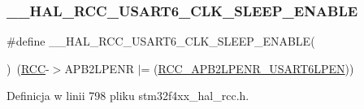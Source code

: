 \subsubsection{\texorpdfstring{\+\_\+\+\_\+\+H\+A\+L\+\_\+\+R\+C\+C\+\_\+\+U\+S\+A\+R\+T6\+\_\+\+C\+L\+K\+\_\+\+S\+L\+E\+E\+P\+\_\+\+E\+N\+A\+B\+LE}{\_\_HAL\_RCC\_USART6\_CLK\_SLEEP\_ENABLE}}
{\footnotesize\ttfamily \#define \+\_\+\+\_\+\+H\+A\+L\+\_\+\+R\+C\+C\+\_\+\+U\+S\+A\+R\+T6\+\_\+\+C\+L\+K\+\_\+\+S\+L\+E\+E\+P\+\_\+\+E\+N\+A\+B\+LE(\begin{DoxyParamCaption}{ }\end{DoxyParamCaption})~(\hyperlink{group___peripheral__declaration_ga74944438a086975793d26ae48d5882d4}{R\+CC}-\/$>$A\+P\+B2\+L\+P\+E\+NR $\vert$= (\hyperlink{group___peripheral___registers___bits___definition_ga2b82eb1986da9ed32e6701d01fffe55d}{R\+C\+C\+\_\+\+A\+P\+B2\+L\+P\+E\+N\+R\+\_\+\+U\+S\+A\+R\+T6\+L\+P\+EN}))}



Definicja w linii 798 pliku stm32f4xx\+\_\+hal\+\_\+rcc.\+h.


